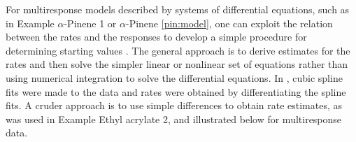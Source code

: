 For multiresponse models described by systems of differential
equations, such as in Example $\alpha$-Pinene 1 or
$\alpha$-Pinene \ref{pin:model}, one can exploit the relation
between the rates and the responses to develop a simple procedure
for determining starting values
\cite{bate:watt:1985,vara:1982}.
The general approach is to derive estimates for the rates and
then solve the simpler linear or nonlinear set of equations
rather than using numerical integration to solve the differential
equations.
In , cubic spline fits were made to the data and
rates were obtained by differentiating the spline fits.
A cruder approach is to use simple differences to obtain
rate estimates, as was used in Example Ethyl acrylate 2, and
illustrated below for multiresponse data.
\label{pin:2}
